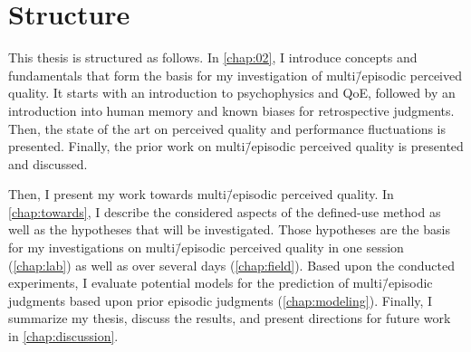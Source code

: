 \section{Structure}
This thesis is structured as follows.
In \autoref{chap:02}, I introduce concepts and fundamentals that form the basis for my investigation of multi\=/episodic perceived quality.
It starts with an introduction to psychophysics and \ac{QoE}, followed by an introduction into human memory and known biases for retrospective judgments.
Then, the state of the art on perceived quality and performance fluctuations is presented.
Finally, the prior work on multi\=/episodic perceived quality is presented and discussed.

Then, I present my work towards multi\=/episodic perceived quality. %
In \autoref{chap:towards}, I describe the considered aspects of the defined-use method as well as the hypotheses that will be investigated.
Those hypotheses are the basis for my investigations on multi\=/episodic perceived quality in one session (\autoref{chap:lab}) as well as over several days (\autoref{chap:field}).
Based upon the conducted experiments, I evaluate potential models for the prediction of multi\=/episodic judgments based upon prior episodic judgments (\autoref{chap:modeling}).
Finally, I summarize my thesis, discuss the results, and present directions for future work in \autoref{chap:discussion}.
